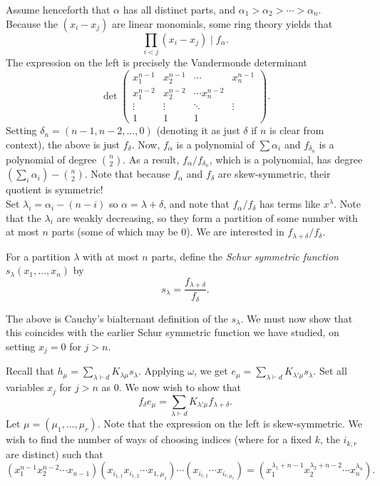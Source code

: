 	Assume henceforth that $\alpha$ has all distinct parts, and $\alpha_1 > \alpha_2 > \cdots > \alpha_n$.\\
	Because the $(x_i - x_j)$ are linear monomials, some ring theory yields that
	\[ \prod_{i < j} (x_i - x_j) \mid f_\alpha. \]
	The expression on the left is precisely the Vandermonde determinant
	\[ \det \begin{pmatrix} x_1^{n-1} & x_2^{n-1} & \cdots & x_n^{n-1} \\ x_1^{n-2} & x_2^{n-2} & \cdots x_n^{n-2} \\ \vdots & \vdots & \ddots & \vdots \\ 1 & 1 & 1 \end{pmatrix}. \]
	Setting $\delta_n = (n-1,n-2,\ldots,0)$ (denoting it as just $\delta$ if $n$ is clear from context), the above is just $f_{\delta}$. Now, $f_\alpha$ is a polynomial of $\sum \alpha_i$ and $f_{\delta_n}$ is a polynomial of degree $\binom{n}{2}$. As a result, $f_\alpha/f_{\delta_n}$, which is a polynomial, has degree $\left(\sum_i \alpha_i\right) - \binom{n}{2}$. Note that because $f_\alpha$ and $f_\delta$ are skew-symmetric, their quotient is symmetric!\\
	Set $\lambda_i = \alpha_i - (n-i)$ so $\alpha = \lambda + \delta$, and note that $f_\alpha/f_\delta$ has terms like $x^\lambda$. Note that the $\lambda_i$ are weakly decreasing, so they form a partition of some number with at most $n$ parts (some of which may be $0$). We are interested in $f_{\lambda+\delta}/f_\delta$.

	\begin{fdef}
		For a partition $\lambda$ with at most $n$ parts, define the \emph{Schur symmetric function} $s_\lambda(x_1,\ldots,x_n)$ by
		\[ s_\lambda = \frac{f_{\lambda+\delta}}{f_\delta}. \]
	\end{fdef}
	The above is Cauchy's bialternant definition of the $s_\lambda$. We must now show that this coincides with the earlier Schur symmetric function we have studied, on setting $x_j = 0$ for $j > n$.

	Recall that $h_\mu = \sum_{\lambda \vdash d} K_{\lambda\mu} s_\lambda$. Applying $\omega$, we get $e_\mu = \sum_{\lambda \vdash d} K_{\lambda'\mu} s_\lambda$. Set all variables $x_j$ for $j > n$ as $0$. We now wish to show that
	\[ f_\delta e_\mu = \sum_{\lambda \vdash d} K_{\lambda'\mu} f_{\lambda+\delta}. \]
	Let $\mu = (\mu_1,\ldots,\mu_r)$. Note that the expression on the left is skew-symmetric. We wish to find the number of ways of choosing indices (where for a fixed $k$, the $i_{k,r}$ are distinct) such that
	\[ (x_1^{n-1} x_2^{n-2} \cdots x_{n-1})(x_{i_{1,1}}x_{i_{1,2}}\cdots x_{1,\mu_1})\cdots(x_{i_{r,1}}\cdots x_{i_{r,\mu_r}}) = ( x_1^{\lambda_1 + n-1} x_2^{\lambda_2 + n-2} \cdots x_n^{\lambda_n} ). \]


